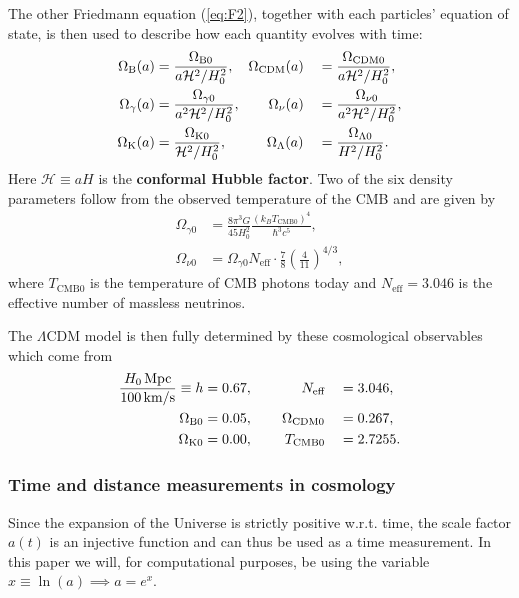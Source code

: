 \documentclass[%
reprint,
 amsmath,amssymb,
 aps,
]{revtex4-2}
\newcommand{\Hp}{\mathcal{H}}
\begin{document}
The other Friedmann equation (\ref{eq:F2}), together with each particles' equation of state, is then used to describe how each quantity evolves with time:
\begin{alignat}{2}
	\Omega_{\text B}(a)&=\frac{\Omega_{\text B0}}{a\Hp^2/H_0^2},\hspace{3.5mm}\Omega_{\text{CDM}}(a)&&=\frac{\Omega_{\text{CDM}0}}{a\Hp^2/H_0^2},\nonumber\\
	\Omega_{\gamma}(a)&=\frac{\Omega_{\gamma0}}{a^2\Hp^2/H_0^2},\hspace{7mm}\Omega_{\nu}(a)&&=\frac{\Omega_{\nu0}}{a^2\Hp^2/H_0^2},\label{eq:Omegai}\\
	\Omega_{\text K}(a)&=\frac{\Omega_{\text K0}}{\Hp^2/H_0^2},\hspace{10mm}\Omega_{\Lambda}(a)&&=\frac{\Omega_{\Lambda0}}{H^2/H_0^2}.\nonumber
\end{alignat}
Here $\Hp\equiv aH$ is the \textbf{conformal Hubble factor}. Two of the six density parameters follow from the observed temperature of the CMB and are given by
\begin{align}
	\label{eq:ORad}
	\Omega_{\gamma0}&=\frac{8\pi^3 G}{45 H_0^2}\frac{(k_BT_{\text{CMB}0})^4}{\hbar^3 c^5},\\
	\label{eq:ONu}
	\Omega_{\nu0}&=\Omega_{\gamma0}N_{\text{eff}}\cdot\frac{7}{8}\left(\frac{4}{11}\right)^{4/3},
\end{align}
where $T_{\text{CMB}0}$ is the temperature of CMB photons today and $N_{\text{eff}}=3.046$ is the effective number of massless neutrinos. \cite{Planck:2018vyg}

The $\Lambda$CDM model is then fully determined by these cosmological observables which come from \cite{Planck:2018vyg}
\begin{alignat}{2}
	\frac{H_0\,\text{Mpc}}{100\,\text{km/s}}\equiv h &= 0.67,\hspace{12.2mm}N_\text{eff}&&=3.046,\nonumber\\
	\Omega_{\text B0}&=0.05,\hspace{7.3mm}\Omega_{\text{CDM}0}&&=0.267,\label{eq:planck_data}\\
	\Omega_{\text K0}&=0.00,\hspace{8mm}T_{\text{CMB}0}&&=2.7255.\nonumber
\end{alignat}
\subsubsection{Time and distance measurements in cosmology}
Since the expansion of the Universe is strictly positive w.r.t. time, the scale factor $a(t)$ is an injective function and can thus be used as a time measurement. In this paper we will, for computational purposes, be using the variable $x\equiv\ln(a)\implies a=e^x$. 
\end{document}
